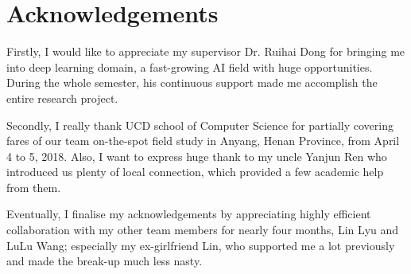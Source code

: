 \chapter*{Acknowledgements}
Firstly, I would like to appreciate my supervisor Dr. Ruihai Dong for bringing me into deep learning domain, a fast-growing AI field with huge opportunities. During the whole semester, his continuous support made me accomplish the entire research project.

Secondly, I really thank UCD school of Computer Science for partially covering fares of our team on-the-spot field study in Anyang, Henan Province, from April 4 to 5, 2018. Also, I want to express huge thank to my uncle Yanjun Ren who introduced us plenty of local connection, which provided a few academic help from them.

Eventually, I finalise my acknowledgements by appreciating highly efficient collaboration with my other team members for nearly four months, Lin Lyu and LuLu Wang; especially my ex-girlfriend Lin, who supported me a lot previously and made the break-up much less nasty.